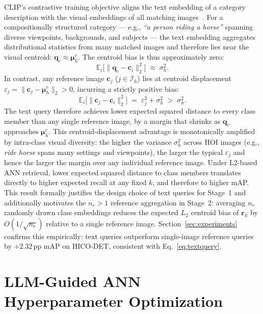 \documentclass[sigconf, nonacm]{acmart}
\theoremstyle{definition}
\begin{document}
CLIP's contrastive training objective aligns the text embedding of a category
description with the visual embeddings of all matching images~\cite{radford2021clip}.
For a compositionally structured category --- e.g., \textit{``a person riding a horse''}
spanning diverse viewpoints, backgrounds, and subjects --- the text embedding
aggregates distributional statistics from many matched images and therefore
lies near the visual centroid: $\mathbf{q}_c \approx \boldsymbol{\mu}_h^c$.
The centroid bias is thus approximately zero:
\begin{equation}
  \mathbb{E}_{i}\bigl[\|\mathbf{q}_c - \mathbf{c}_i\|_2^2\bigr]
  \;\approx\; \sigma_h^2 .
  \label{eq:textquery}
\end{equation}
In contrast, any reference image $\mathbf{c}_j$ ($j \in \mathcal{I}_h$) lies at
centroid displacement $\varepsilon_j = \|\mathbf{c}_j - \boldsymbol{\mu}_h^c\|_2 > 0$,
incurring a strictly positive bias:
\begin{equation}
  \mathbb{E}_{i}\bigl[\|\mathbf{c}_j - \mathbf{c}_i\|_2^2\bigr]
  \;=\; \varepsilon_j^2 + \sigma_h^2
  \;>\; \sigma_h^2 .
  \label{eq:imagequery}
\end{equation}
The text query therefore achieves lower expected squared distance to every
class member than any single reference image, by a margin that shrinks as
$\mathbf{q}_c$ approaches $\boldsymbol{\mu}_h^c$.
This centroid-displacement advantage is monotonically amplified by intra-class visual
diversity: the higher the variance $\sigma_h^2$ across HOI images (e.g., \textit{ride
horse} spans many settings and viewpoints), the larger the typical $\varepsilon_j$
and hence the larger the margin over any individual reference image.
Under L2-based ANN retrieval, lower expected squared distance to class members
translates directly to higher expected recall at any fixed $k$, and therefore to
higher mAP.
This result formally justifies the design choice of text queries for Stage~1 and
additionally motivates the $n_r{>}1$ reference aggregation in Stage~2: averaging
$n_r$ randomly drawn class embeddings reduces the expected $L_2$ centroid bias of $\mathbf{r}_h$
by $O(1/\sqrt{n_r})$ relative to a single reference image.
Section~\ref{sec:experiments} confirms this empirically: text queries outperform
single-image reference queries by $+2.32$\,pp mAP on HICO-DET, consistent with
Eq.~\eqref{eq:textquery}.

\section{LLM-Guided ANN Hyperparameter Optimization}
\label{sec:optimizer}
\end{document}
